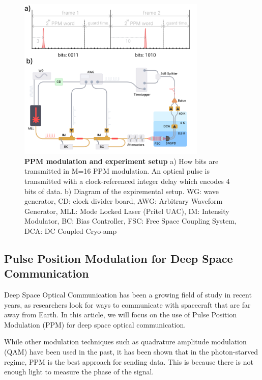 \documentclass[11pt]{caltech_thesis} %
\begin{document}
\hypertarget{fig:intro}{%
\begin{figure}
\centering
\includegraphics[width=0.8\textwidth,height=\textheight]{chapter_03/figs_03/fig_intro_light.pdf}
\caption[{PPM modulation and experiment setup}]{\textbf{PPM modulation
and experiment setup} a) How bits are transmitted in M=16 PPM
modulation. An optical pulse is transmitted with a clock-referenced
integer delay which encodes 4 bits of data. b) Diagram of the
expiremental setup. WG: wave generator, CD: clock divider board, AWG:
Arbitrary Waveform Generator, MLL: Mode Locked Laser (Pritel UAC), IM:
Intensity Modulator, BC: Bias Controller, FSC: Free Space Coupling
System, DCA: DC Coupled Cryo-amp}
\label{fig:intro}
\end{figure}
}

\hypertarget{pulse-position-modulation-for-deep-space-communication-1}{%
\subsection{Pulse Position Modulation for Deep Space
Communication}\label{pulse-position-modulation-for-deep-space-communication-1}}

Deep Space Optical Communication has been a growing field of study in
recent years, as researchers look for ways to communicate with
spacecraft that are far away from Earth. In this article, we will focus
on the use of Pulse Position Modulation (PPM) for deep space optical
communication.

While other modulation techniques such as quadrature amplitude
modulation (QAM) have been used in the past, it has been shown that in
the photon-starved regime, PPM is the best approach for sending data.
This is because there is not enough light to measure the phase of the
signal.
\end{document}

